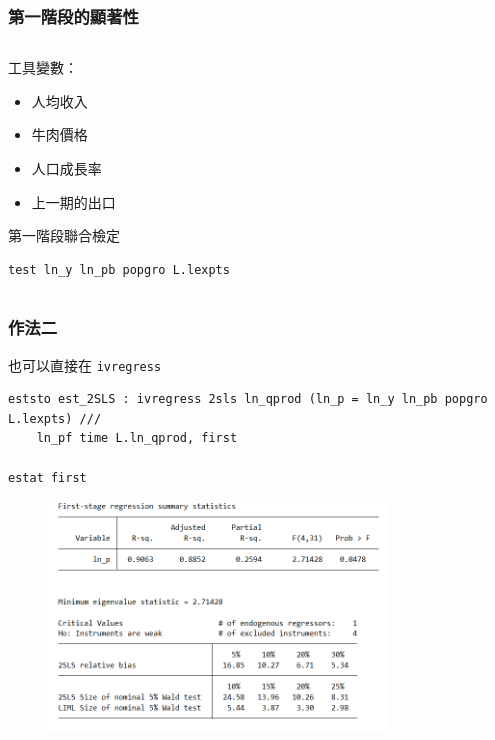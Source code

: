 \begin{frame}[fragile]
    \frametitle{第一階段的顯著性}
    
    \begin{columns}
        \begin{column}{0.5\textwidth}
            工具變數：
            \begin{itemize}
                \item 人均收入
                \item 牛肉價格
                \item 人口成長率
                \item 上一期的出口
            \end{itemize}

            第一階段聯合檢定
            \begin{lstlisting}
test ln_y ln_pb popgro L.lexpts \end{lstlisting}
        \end{column}

        \begin{column}{0.5\textwidth}
            \begin{table}
                \centering
                \scalebox{0.6}{
                
                }
            \end{table}
        \end{column}
    \end{columns}
\end{frame}

\begin{frame}[fragile]
    \frametitle{作法二}
    也可以直接在 \texttt{ivregress} 
    \begin{lstlisting}
eststo est_2SLS : ivregress 2sls ln_qprod (ln_p = ln_y ln_pb popgro L.lexpts) /// 
    ln_pf time L.ln_qprod, first

estat first\end{lstlisting}
    
    \begin{figure}
        \includegraphics[width=0.8\textwidth]{fig/result_11-12-c.png}
    \end{figure}
\end{frame}

